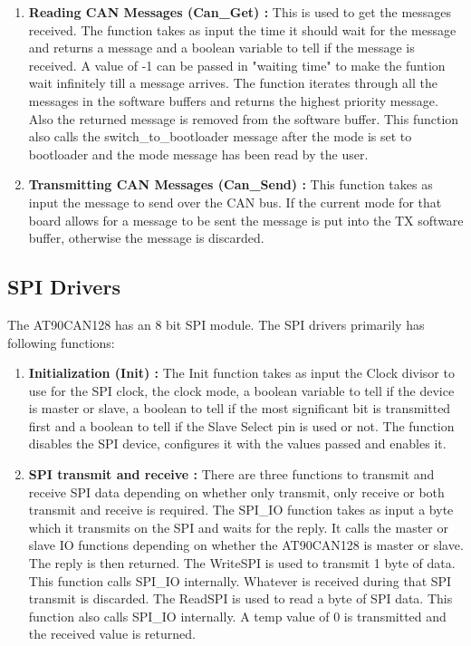 \begin{enumerate}
\item \textbf{Reading CAN Messages (Can\_Get) :} This is used to get the messages received. The function takes as input the time it should wait for the message and returns a message and a boolean variable to tell if the message is received. A value of -1 can be passed in "waiting time" to make the funtion wait infinitely till a message arrives. The function iterates through all the messages in the software buffers and returns the highest priority message. Also the returned message is removed from the software buffer. This function also calls the switch\_to\_bootloader message after the mode is set to bootloader and the mode message has been read by the user.
\item \textbf{Transmitting CAN Messages (Can\_Send) :} This function takes as input the message to send over the CAN bus. If the current mode for that board allows for a message to be sent the message is put into the TX software buffer, otherwise the message is discarded.
\end{enumerate}

\subsection{SPI Drivers}
The AT90CAN128 has an 8 bit SPI module. The SPI drivers primarily has following functions:
\begin{enumerate}
\item \textbf{Initialization (Init) :} The Init function takes as input the Clock divisor to use for the SPI clock, the clock mode, a boolean variable to tell if the device is master or slave, a boolean to tell if the most significant bit is transmitted first and a boolean to tell if the Slave Select pin is used or not. The function disables the SPI device, configures it with the values passed and enables it.
\item \textbf{SPI transmit and receive :} There are three functions to transmit and receive SPI data depending on whether only transmit, only receive or both transmit and receive is required. 
The SPI\_IO function takes as input a byte which it transmits on the SPI and waits for the reply. It calls the master or slave IO functions depending on whether the AT90CAN128 is master or slave. The reply is then returned. \newline
The WriteSPI is used to transmit 1 byte of data. This function calls SPI\_IO internally. Whatever is received during that SPI transmit is discarded. \newline
The ReadSPI is used to read a byte of SPI data. This function also calls SPI\_IO internally. A temp value of 0 is transmitted and the received value is returned.
\end{enumerate}

